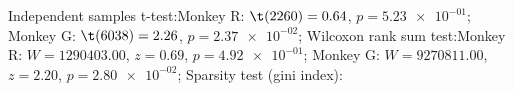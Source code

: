 Independent samples t-test:Monkey R: $\t(2260) = 0.64$, $p = \num{5.23e-01}$; 
Monkey G: $\t(6038) = 2.26$, $p = \num{2.37e-02}$; 
Wilcoxon rank sum test:Monkey R: $W = 1290403.00$, $z = 0.69$, $p = \num{4.92e-01}$; 
Monkey G: $W = 9270811.00$, $z = 2.20$, $p = \num{2.80e-02}$; 
Sparsity test (gini index):